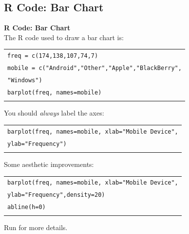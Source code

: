 \documentclass[compress]{beamer}        %
\makeatletter
\newcommand{\tcb}{\textcolor{beamer@blendedblue}}
\makeatother
\begin{document}
\subsection{R Code: Bar Chart}
\begin{frame}{\bf \tcb{R Code: Bar Chart}\\[-1.1cm]}
The R code used to draw a bar chart is:\\[0.1cm]
\begin{tabular}{|l|}
\hline
\texttt{freq = c(174,138,107,74,7)}\\
\texttt{mobile = c("Android","Other","Apple","BlackBerry",}\\
\hspace{2.6cm}\texttt{"Windows")}\\
\texttt{barplot(freq, names=mobile)}\\
\hline
\multicolumn{1}{c}{}\\[-0.1cm]
\end{tabular}
You should \emph{always} label the axes:\\[0.1cm]
\begin{tabular}{|l|}
\hline
\texttt{barplot(freq, names=mobile, xlab="Mobile Device",}\\
\hspace{1.9cm}\texttt{ylab="Frequency")}\\
\hline
\multicolumn{1}{c}{}\\[-0.1cm]
\end{tabular}
Some aesthetic improvements:\\[0.1cm]
\begin{tabular}{|l|}
\hline
\texttt{barplot(freq, names=mobile, xlab="Mobile Device",}\\
\hspace{1.9cm}\texttt{ylab="Frequency",density=20)}\\
\texttt{abline(h=0)}\\
\hline
\multicolumn{1}{c}{}\\[-0.1cm]
\end{tabular}
Run  for more details.
\end{frame}
\end{document}

